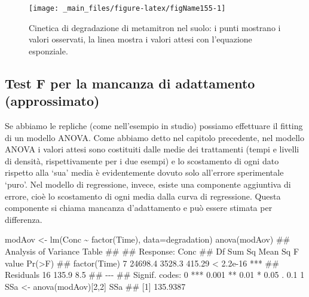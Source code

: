 \documentclass[a4paper,12pt,oneside]{book}
\newenvironment{Shaded}{\begin{snugshade}}{\end{snugshade}}
\newcommand{\DecValTok}[1]{#1}
\newcommand{\SpecialCharTok}[1]{#1}
\newcommand{\DocumentationTok}[1]{#1}
\newcommand{\OtherTok}[1]{#1}
\newcommand{\FunctionTok}[1]{#1}
\newcommand{\AttributeTok}[1]{#1}
\newcommand{\NormalTok}[1]{#1}
\begin{document}
\begin{figure}

{\centering \texttt{[image: \_main\_files/figure-latex/figName155-1]} 

}

\caption{Cinetica di degradazione di metamitron nel suolo: i punti mostrano i valori osservati, la linea mostra i valori attesi con l'equazione esponziale.}\label{fig:figName155}
\end{figure}

\hypertarget{test-f-per-la-mancanza-di-adattamento-approssimato}{%
\subsection{Test F per la mancanza di adattamento (approssimato)}\label{test-f-per-la-mancanza-di-adattamento-approssimato}}

Se abbiamo le repliche (come nell'esempio in studio) possiamo effettuare il fitting di un modello ANOVA. Come abbiamo detto nel capitolo precedente, nel modello ANOVA i valori attesi sono costituiti dalle medie dei trattamenti (tempi e livelli di densità, rispettivamente per i due esempi) e lo scostamento di ogni dato rispetto alla `sua' media è evidentemente dovuto solo all'errore sperimentale `puro'. Nel modello di regressione, invece, esiste una componente aggiuntiva di errore, cioè lo scostamento di ogni media dalla curva di regressione. Questa componente si chiama mancanza d'adattamento e può essere stimata per differenza.

\begin{Shaded}
\begin{Highlighting}[]
\NormalTok{modAov }\OtherTok{\textless{}{-}} \FunctionTok{lm}\NormalTok{(Conc }\SpecialCharTok{\textasciitilde{}} \FunctionTok{factor}\NormalTok{(Time), }\AttributeTok{data=}\NormalTok{degradation)}
\FunctionTok{anova}\NormalTok{(modAov)}
\DocumentationTok{\#\# Analysis of Variance Table}
\DocumentationTok{\#\# }
\DocumentationTok{\#\# Response: Conc}
\DocumentationTok{\#\#              Df  Sum Sq Mean Sq F value    Pr(\textgreater{}F)    }
\DocumentationTok{\#\# factor(Time)  7 24698.4  3528.3  415.29 \textless{} 2.2e{-}16 ***}
\DocumentationTok{\#\# Residuals    16   135.9     8.5                      }
\DocumentationTok{\#\# {-}{-}{-}}
\DocumentationTok{\#\# Signif. codes:  0 \textquotesingle{}***\textquotesingle{} 0.001 \textquotesingle{}**\textquotesingle{} 0.01 \textquotesingle{}*\textquotesingle{} 0.05 \textquotesingle{}.\textquotesingle{} 0.1 \textquotesingle{} \textquotesingle{} 1}
\NormalTok{SSa }\OtherTok{\textless{}{-}} \FunctionTok{anova}\NormalTok{(modAov)[}\DecValTok{2}\NormalTok{,}\DecValTok{2}\NormalTok{]}
\NormalTok{SSa}
\DocumentationTok{\#\# [1] 135.9387}
\end{Highlighting}
\end{Shaded}
\end{document}
